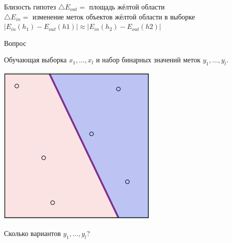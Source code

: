 \documentclass[10pt]{beamer}
\begin{document}

\begin{frame}{Близость гипотез}  
  $\bigtriangleup E_{out} = $ площадь жёлтой области\\
  \bigbreak
  $\bigtriangleup E_{in} = $ изменение меток объектов жёлтой области в выборке\\
  \bigbreak
  $\vert E_{in}(h_1) - E_{out}(h1) \vert \approx \vert E_{in}(h_2) - E_{out}(h2) \vert$  
\end{frame}

\begin{frame}{Вопрос}  
  \begin{minipage}[t]{0.5\linewidth}
    \begin{flushleft}
    Обучающая выборка $x_1, \dots, x_l$ и набор бинарных значений меток $y_1,\dots,y_l$.\\
    \end{flushleft}
  \end{minipage}%
  \begin{minipage}{0.5\linewidth}
      \centering
        \includegraphics[width=0.8 \textwidth, keepaspectratio]{images/dich}    
  \end{minipage}%
  \centering  
  \bigbreak
  Сколько вариантов $y_1,\dots, y_l$? 
\end{frame}
\end{document}
